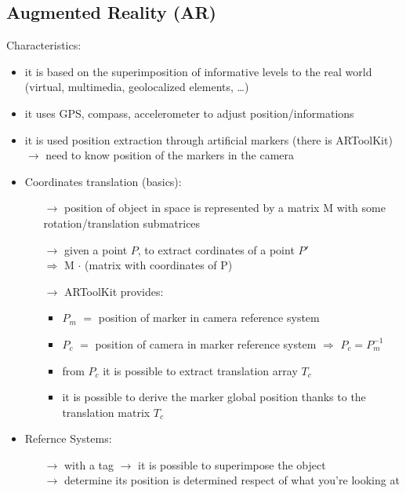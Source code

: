 \subsection{Augmented Reality (AR)}
Characteristics:
\begin{itemize}
    \item it is based on the superimposition of informative
    levels to the real world\\(virtual, multimedia, geolocalized elements, \dots)
    \item it uses GPS, compass, accelerometer to adjust position/informations
    \item it is used position extraction through artificial markers (there is ARToolKit)\\
    $\rightarrow$ need to know position of the markers in the camera
    \item Coordinates translation (basics):
    \begin{itemize}
        \item[$\rightarrow$] position of object in space is represented by a matrix M with some rotation/translation submatrices
        \item[$\rightarrow$] given a point $P$, to extract cordinates of a point $P'$\\
        $\Rightarrow$ M $\cdot$ (matrix with coordinates of P)
        \item[$\rightarrow$] ARToolKit provides:
        \begin{itemize}
            \item $P_m$ $=$ position of marker in camera reference system
            \item $P_c$ $=$ position of camera in marker reference system $\Rightarrow$ $P_c = P_m^{-1}$
            \item from $P_c$ it is possible to extract translation array $T_c$
            \item it is possible to derive the marker global position thanks to the\\
            translation matrix $T_c$
        \end{itemize}
    \end{itemize}
    \item Refernce Systems:
    \begin{itemize}
        \item[$\rightarrow$] with a tag $\rightarrow$ it is possible to superimpose the object\\
        $\rightarrow$ determine its position is determined respect of what you're looking at

\end{itemize}
\end{itemize}
